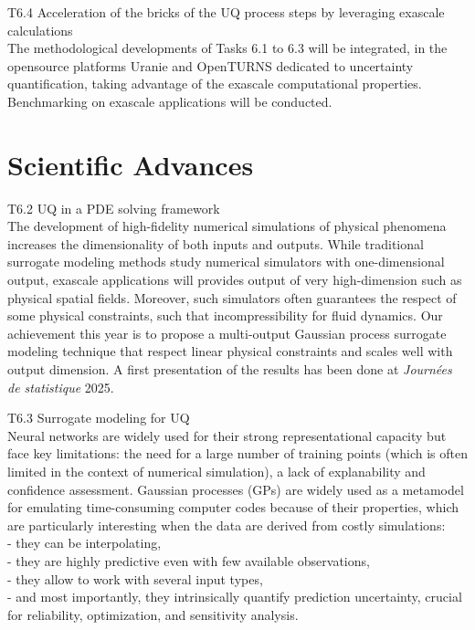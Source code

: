 T6.4 Acceleration of the bricks of the UQ process steps by leveraging exascale calculations\\
The methodological developments of Tasks 6.1 to 6.3 will be integrated, in the opensource platforms
Uranie and OpenTURNS dedicated to uncertainty quantification, taking advantage of the exascale
computational properties. Benchmarking on exascale applications will be conducted.


\section{Scientific Advances}

T6.2 UQ in a PDE solving framework \\ 
The development of high-fidelity numerical simulations of physical phenomena increases the dimensionality of both inputs and outputs. While traditional surrogate modeling methods study numerical simulators with one-dimensional output, exascale applications will provides output of very high-dimension such as physical spatial fields. Moreover, such simulators often guarantees the respect of some physical constraints, such that incompressibility for fluid dynamics. Our achievement this year is to propose a multi-output Gaussian process surrogate modeling technique that respect linear physical constraints and scales well with output dimension. A first presentation of the results has been done at \textit{Journées de statistique} 2025. 


T6.3 Surrogate modeling for UQ\\
Neural networks are widely used for their strong representational capacity but face key limitations: the need for a large number of training points (which is often limited in the context of numerical simulation), a lack of explanability and confidence assessment.
Gaussian processes (GPs) are widely used as a metamodel for emulating time-consuming computer codes because of  their properties, which are particularly interesting when the data are derived from costly simulations:\\
- they can be interpolating,\\
- they are highly predictive even with few available observations,\\
- they allow to work with several input types,\\
- and most importantly, they intrinsically quantify prediction uncertainty, crucial for reliability, optimization, and sensitivity analysis.

